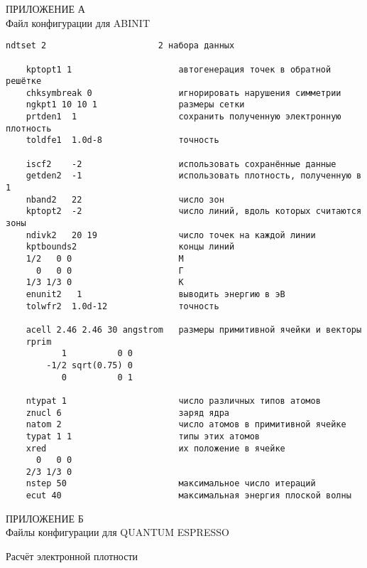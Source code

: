 \begin{center}
    ПРИЛОЖЕНИЕ А\\
    Файл конфигурации для ABINIT
\end{center}
\begin{Verbatim}[fontfamily=courier,fontsize=\footnotesize]
    ndtset 2                      2 набора данных

    kptopt1 1                     автогенерация точек в обратной решётке
    chksymbreak 0                 игнорировать нарушения симметрии
    ngkpt1 10 10 1                размеры сетки
    prtden1  1                    сохранить полученную электронную плотность
    toldfe1  1.0d-8               точность

    iscf2    -2                   использовать сохранённые данные
    getden2  -1                   использовать плотность, полученную в 1
    nband2   22                   число зон
    kptopt2  -2                   число линий, вдоль которых считаются зоны
    ndivk2   20 19                число точек на каждой линии
    kptbounds2                    концы линий
    1/2   0 0                     M
      0   0 0                     Г
    1/3 1/3 0                     К
    enunit2   1                   выводить энергию в эВ
    tolwfr2  1.0d-12              точность

    acell 2.46 2.46 30 angstrom   размеры примитивной ячейки и векторы
    rprim
           1          0 0
        -1/2 sqrt(0.75) 0
           0          0 1

    ntypat 1                      число различных типов атомов
    znucl 6                       заряд ядра
    natom 2                       число атомов в примитивной ячейке
    typat 1 1                     типы этих атомов
    xred                          их положение в ячейке
      0   0 0
    2/3 1/3 0
    nstep 50                      максимальное число итераций
    ecut 40                       максимальная энергия плоской волны
\end{Verbatim}
\newpage
\begin{center}
    ПРИЛОЖЕНИЕ Б\\
    Файлы конфигурации для QUANTUM ESPRESSO
\end{center}
Расчёт электронной плотности
